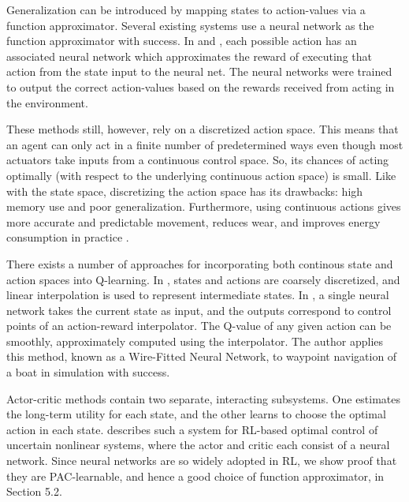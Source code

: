\documentclass{article} %
\begin{document}
Generalization can be introduced by mapping states to action-values via a function approximator.  Several existing systems use a neural network as the function approximator \cite{lin} \cite{deep_rl} \cite{gaskett_thesis} with success. In \cite{lin} and \cite{deep_rl}, each possible action has an associated neural network which approximates the reward of executing that action from the state input to the neural net.  The neural networks were trained to output the correct action-values based on the rewards received from acting in the environment.  

These methods still, however, rely on a discretized action space.  This means that an agent can only act in a finite number of predetermined ways even though most actuators take inputs from a continuous control space. So, its chances of acting optimally (with respect to the underlying continuous action space) is small.  Like with the state space, discretizing the action space has its drawbacks: high memory use and poor generalization.  Furthermore, using continuous actions gives more accurate and predictable movement, reduces wear, and improves energy consumption in practice \cite{gaskett_thesis}. 

There exists a number of approaches for incorporating both continous state and action spaces into Q-learning.  In \cite{takahashi}, states and actions are coarsely discretized, and linear interpolation is used to represent intermediate states.  In \cite{gaskett_thesis}, a single neural network takes the current state as input, and the outputs correspond to control points of an action-reward interpolator.  The Q-value of any given action can be smoothly, approximately computed using the interpolator.  The author applies this method, known as a Wire-Fitted Neural Network, to waypoint navigation of a boat in simulation with success.

Actor-critic methods contain two separate, interacting subsystems.  One estimates the long-term utility for each state, and the other learns to choose the optimal action in each state.  \cite{bhasin_reinforcement_2011} describes such a system for RL-based optimal control of uncertain nonlinear systems, where the actor and critic each consist of a neural network.  Since neural networks are so widely adopted in RL, we show proof that they are PAC-learnable, and hence a good choice of function approximator, in Section 5.2.
\end{document}
